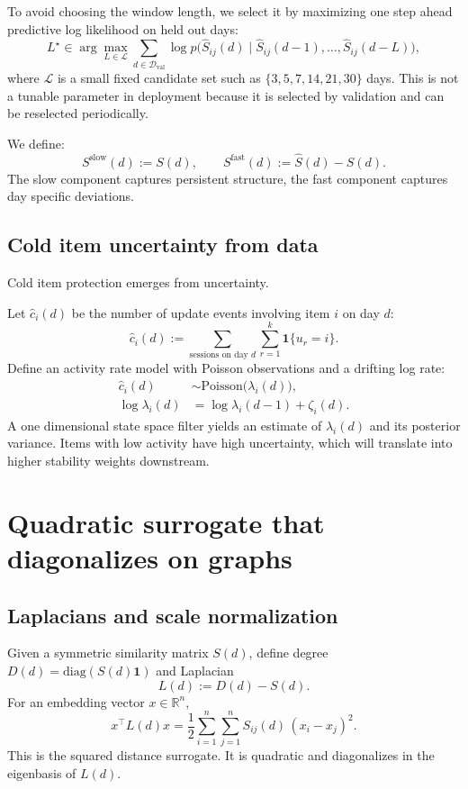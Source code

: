 \documentclass[11pt]{article}
\begin{document}
To avoid choosing the window length, we select it by maximizing one step ahead predictive log likelihood on held out days:
\[
L^\star \in \arg\max_{L\in\mathcal{L}} \sum_{d\in\mathcal{D}_{\text{val}}} \log p\bigl(\widehat{S}_{ij}(d)\mid \widehat{S}_{ij}(d-1),\dots,\widehat{S}_{ij}(d-L)\bigr),
\]
where $\mathcal{L}$ is a small fixed candidate set such as $\{3,5,7,14,21,30\}$ days.
This is not a tunable parameter in deployment because it is selected by validation and can be reselected periodically.

We define:
\[
S^{\text{slow}}(d) := S(d),
\qquad
S^{\text{fast}}(d) := \widehat{S}(d) - S(d).
\]
The slow component captures persistent structure, the fast component captures day specific deviations.

\subsection{Cold item uncertainty from data}
Cold item protection emerges from uncertainty.

Let $\widehat{c}_i(d)$ be the number of update events involving item $i$ on day $d$:
\[
\widehat{c}_i(d) := \sum_{\text{sessions on day }d}\sum_{r=1}^{k}\mathbf{1}\{u_r=i\}.
\]
Define an activity rate model with Poisson observations and a drifting log rate:
\begin{align}
\widehat{c}_i(d) &\sim \mathrm{Poisson}\bigl(\lambda_i(d)\bigr), \\
\log \lambda_i(d) &= \log \lambda_i(d-1) + \zeta_i(d).
\end{align}
A one dimensional state space filter yields an estimate of $\lambda_i(d)$ and its posterior variance.
Items with low activity have high uncertainty, which will translate into higher stability weights downstream.

\section{Quadratic surrogate that diagonalizes on graphs}
\subsection{Laplacians and scale normalization}
Given a symmetric similarity matrix $S(d)$, define degree $D(d)=\mathrm{diag}(S(d)\mathbf{1})$ and Laplacian
\[
L(d) := D(d) - S(d).
\]
For an embedding vector $x\in\mathbb{R}^n$,
\[
x^\top L(d) x = \frac12\sum_{i=1}^n\sum_{j=1}^n S_{ij}(d)\,(x_i-x_j)^2.
\]
This is the squared distance surrogate. It is quadratic and diagonalizes in the eigenbasis of $L(d)$.
\end{document}
